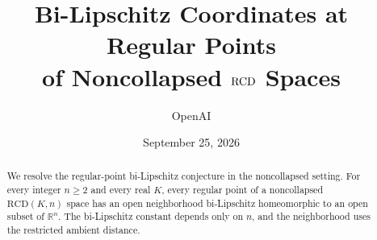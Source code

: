 \documentclass[11pt]{article}
\title{Bi-Lipschitz Coordinates at Regular Points\\
of Noncollapsed \(\RCD\) Spaces}
\author{OpenAI}
\date{September 25, 2026}
\numberwithin{equation}{section}
\theoremstyle{definition}
\theoremstyle{remark}
\newcommand{\R}{\mathbb R}
\newcommand{\RCD}{\mathrm{RCD}}
\begin{document}
\maketitle
\begin{abstract}
We resolve the regular-point bi-Lipschitz conjecture in the noncollapsed
setting. For every integer \(n\ge2\) and every real \(K\), every regular
point of a noncollapsed \(\RCD(K,n)\) space has an open neighborhood
bi-Lipschitz homeomorphic to an open subset of \(\R^n\). The bi-Lipschitz
constant depends only on \(n\), and the neighborhood uses the restricted
ambient distance.
\end{abstract}






\end{document}
